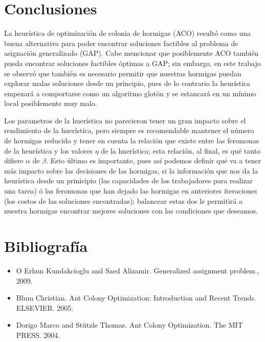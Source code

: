 \documentclass{article}
\begin{document}
    \section{Conclusiones} \label{conclussion}
    La heurística de optimización de colonia de hormigas
    (ACO) resultó como una buena alternativa para 
    poder encontrar soluciones factibles al problema 
    de asignación generalizado (GAP). Cabe mencionar
    que posiblemente ACO también pueda encontrar
    soluciones factibles óptimas a GAP; sin embargo,
    en este trabajo se observó que también es 
    necesario permitir que nuestras hormigas 
    puedan explorar malas soluciones desde un principio,
    pues de lo contrario la heurística empezará a comportarse
    como un algoritmo glotón y se estancará en un 
    mínimo local posiblemente muy malo.

    Los parametros de la huerística no parecieron 
    tener un gran impacto sobre el rendimiento de la
    huerística, pero siempre es recomendable 
    mantener el número de hormigas reducido y 
    tener en cuenta la relación que existe entre las
    feromonas de la heurística y los valores 
    $\eta$ de la huerística; esta relación, al 
    final, es qué tanto difiere $\alpha$ de $\beta$.
    Esto último es importante, pues así podemos 
    definir qué va a tener más impacto 
    sobre las decisiones de las hormigas, si la 
    información que nos da la heurística desde un 
    prinicipio (las capacidades de los trabajadores
    para realizar una tarea) ó las feromonas que 
    han dejado las hormigas en anteriores iteraciones
    (los costos de las soluciones encontradas); balancear 
    estas dos le permitirá a nuestra hormigas encontrar
    mejores soluciones con las condiciones que deseamos.

    \section*{Bibliografía}
    
    \begin{itemize}
      \item O Erhun Kundakcioglu and Saed Alizamir. 
        Generalized assignment problem., 2009.
      \item Blum Christian. Ant Colony Optimization: 
        Introduction and Recent Trends. ELSEVIER. 2005.
      \item Dorigo Marco and Stützle Thomas.
        Ant Colony Optimization. The MIT PRESS. 2004.
    \end{itemize}
    
\end{document}
